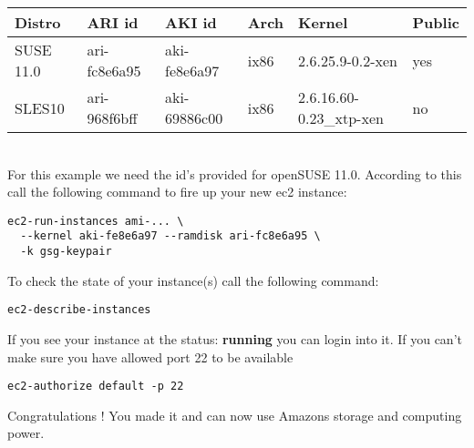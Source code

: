 \begin{tabular}[h]{|p{2cm}|p{2.6cm}|p{2.6cm}|p{1cm}|p{4cm}|p{1.5cm}|}
\hline
\textbf{Distro} & \textbf{ARI id} & \textbf{AKI id} & \textbf{Arch} &
\textbf{Kernel} & \textbf{Public} \\
\hline
SUSE 11.0 & ari-fc8e6a95 & aki-fe8e6a97 & ix86 & 2.6.25.9-0.2-xen & yes\\
SLES10    & ari-968f6bff & aki-69886c00 & ix86 & 2.6.16.60-0.23\_xtp-xen & no\\
\hline
\end{tabular}\\

For this example we need the id's provided for openSUSE 11.0. According
to this call the following command to fire up your new ec2 instance:

\begin{Command}{13cm}
\begin{verbatim}
ec2-run-instances ami-... \
  --kernel aki-fe8e6a97 --ramdisk ari-fc8e6a95 \
  -k gsg-keypair
\end{verbatim}
\end{Command}

To check the state of your instance(s) call the following command:

\begin{Command}{10cm}
\begin{verbatim}
ec2-describe-instances
\end{verbatim}
\end{Command}

If you see your instance at the status: \textbf{running} you can login
into it. If you can't make sure you have allowed port 22 to be available

\begin{Command}{10cm}
\begin{verbatim}
ec2-authorize default -p 22
\end{verbatim}
\end{Command}

Congratulations ! You made it and can now use Amazons storage and
computing power.


